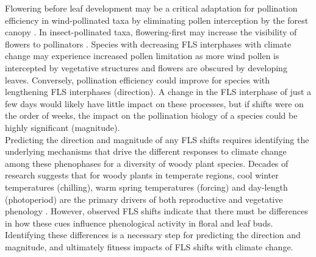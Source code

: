 \documentclass[11pt]{article}
\begin{document}
\noindent Flowering before leaf development may be a critical adaptation for pollination efficiency in wind-pollinated taxa by eliminating pollen interception by the forest canopy \citep{Whitehead1969}. In insect-pollinated taxa, flowering-first may increase the visibility of flowers to pollinators \citep{Janzen1967,Savage2019}. Species with decreasing FLS interphases with climate change may experience increased pollen limitation as more wind pollen is intercepted by vegetative structures and flowers are obscured by developing leaves. Conversely, pollination efficiency could improve for species with lengthening FLS interphases (direction). A change in the FLS interphase of just a few days would likely have little impact on these processes, but if shifts were on the order of weeks, the impact on the pollination biology of a species could be highly significant (magnitude).\\

\noindent Predicting the direction and magnitude of any FLS shifts requires identifying the underlying mechanisms that drive the different responses to climate change among these phenophases for a diversity of woody plant species. %
Decades of research suggests that for woody plants in temperate regions, cool winter temperatures (chilling), warm spring temperatures (forcing) and day-length (photoperiod) are the primary drivers of both reproductive and vegetative phenology \citep{Forrest2010,Flynn2018}. However, observed FLS shifts indicate that there must be differences in how these cues influence phenological activity in floral and leaf buds. %
Identifying these differences is a necessary step for predicting the direction and magnitude, and ultimately fitness impacts of FLS shifts with climate change.\\
 
\end{document}
